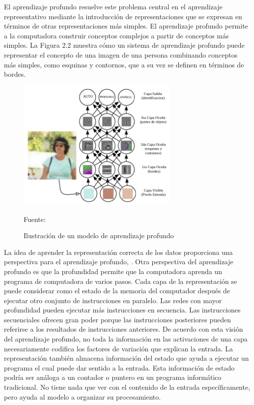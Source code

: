 	El aprendizaje profundo resuelve este problema central en el aprendizaje representativo mediante la introducción de representaciones que se expresan en términos de otras representaciones más simples. El aprendizaje profundo permite a la computadora construir conceptos complejos a partir de conceptos más simples. La Figura 2.2 muestra cómo un sistema de aprendizaje profundo puede representar el concepto de una imagen de una persona combinando conceptos más simples, como esquinas y contornos, que a su vez se definen en términos de bordes.
		\begin{figure}[H]
		\begin{center}
		\includegraphics[width=0.7\textwidth]{images/marcoteorico/deepExam}
		\end{center}
		\begin{center}
		\caption{\small{Ilustración de un modelo de aprendizaje profundo}}
		\vskip -0.25cm
		{\small{Fuente: \cite{Goodfellow-et-al-2016}}}
		\end{center}
		\vspace{-1.5em}
		\end{figure}
	\vskip 0.4cm 
	La idea de aprender la representación correcta de los datos proporciona una perspectiva para el aprendizaje profundo, \citep{Goodfellow-et-al-2016}. Otra perspectiva del aprendizaje profundo es que la profundidad permite que la computadora aprenda un programa de computadora de varios pasos. Cada capa de la representación se puede considerar como el estado de la memoria del computador después de ejecutar otro conjunto de instrucciones en paralelo. Las redes con mayor profundidad pueden ejecutar más instrucciones en secuencia. Las instrucciones secuenciales ofrecen gran poder porque las instrucciones posteriores pueden referirse a los resultados de instrucciones anteriores. De acuerdo con esta visión del aprendizaje profundo, no toda la información en las activaciones de una capa necesariamente codifica los factores de variación que explican la entrada. La representación también almacena información del estado que ayuda a ejecutar un programa el cual puede dar sentido a la entrada. Esta información de estado podría ser análoga a un contador o puntero en un programa informático tradicional. No tiene nada que ver con el contenido de la entrada específicamente, pero ayuda al modelo a organizar su procesamiento.
